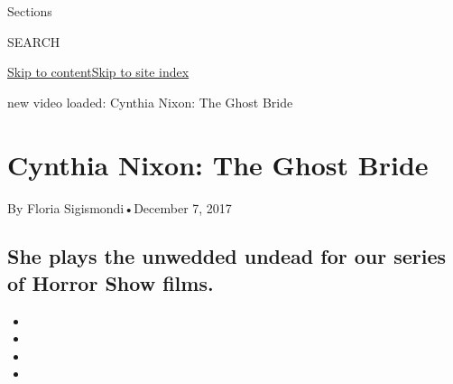 Sections

SEARCH

\protect\hyperlink{site-content}{Skip to
content}\protect\hyperlink{site-index}{Skip to site index}

new video loaded: Cynthia Nixon: The Ghost Bride

\hypertarget{cynthia-nixon-the-ghost-bride}{%
\section{Cynthia Nixon: The Ghost
Bride}\label{cynthia-nixon-the-ghost-bride}}

By Floria Sigismondi•December 7, 2017

\hypertarget{she-plays-the-unwedded-undead-for-our-series-of-horror-show-films}{%
\subsection{She plays the unwedded undead for our series of Horror Show
films.}\label{she-plays-the-unwedded-undead-for-our-series-of-horror-show-films}}

\begin{itemize}
\item
\item
\item
\item
\end{itemize}

